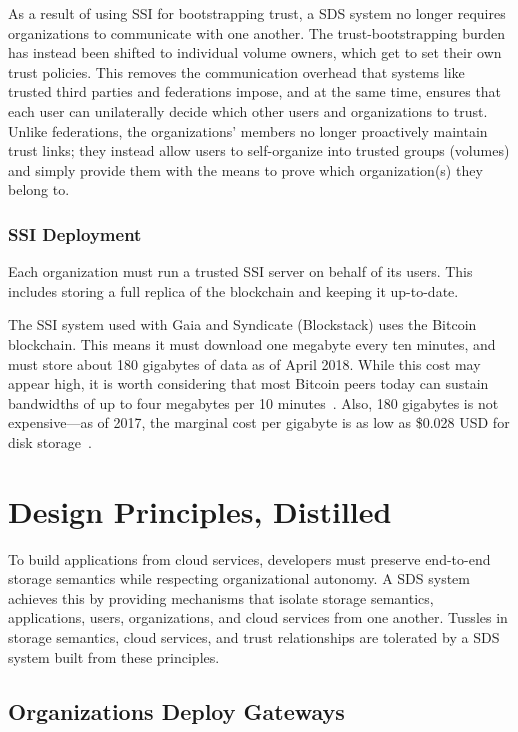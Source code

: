 As a result of using SSI for bootstrapping trust, a SDS system no longer requires
organizations to communicate with one another.
The trust-bootstrapping burden has instead been shifted to individual volume
owners, which get to set their own trust policies.  This removes the
communication overhead that systems like trusted third parties and federations
impose, and at the same time, ensures that each user can unilaterally decide
which other users and organizations to trust.  Unlike federations, the 
organizations' members no longer proactively maintain trust links; they instead allow
users to self-organize into trusted groups (volumes) and simply provide them
with the means to prove which organization(s) they belong to.

\subsubsection{SSI Deployment}

Each organization must run a trusted SSI server on behalf of its users.  This
includes storing a full replica of the blockchain and keeping it up-to-date.

The SSI system used with Gaia and Syndicate (Blockstack) uses the Bitcoin
blockchain.  This means it must download one megabyte every ten minutes, and
must store about 180 gigabytes of data as of April 2018.  While this cost may
appear high, it is worth considering that most Bitcoin peers today can
sustain bandwidths of up to four megabytes per 10
minutes~\cite{on-blockchain-decentralization}.  Also, 180 gigabytes is not
expensive---as of 2017, the marginal cost per gigabyte is as low as
\$0.028 USD for disk storage~\cite{backblaze-hard-drive-cost-per-gigabyte}.

\section{Design Principles, Distilled}

To build applications from cloud services, developers must preserve
end-to-end storage semantics while respecting organizational autonomy.
A SDS system achieves this by providing mechanisms that isolate storage semantics, applications,
users, organizations, and cloud services from one another.  Tussles in storage
semantics, cloud services, and trust relationships are tolerated by a SDS system
built from these principles.

\subsection{Organizations Deploy Gateways}

